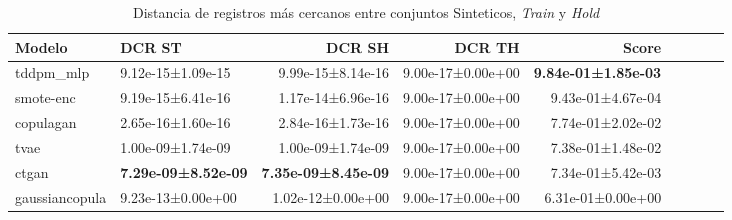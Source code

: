 \begin{table}[H]
\centering
\fontsize{10}{14}\selectfont
\caption{Distancia de registros más cercanos entre conjuntos Sinteticos, \emph{Train} y \emph{Hold}}
\label{table-dcr-economicos-b}
\begin{tabular}{|l|l|r|r|r|r|r|r|r|}
\hline
\rowcolor[gray]{0.8}
Modelo & DCR ST & DCR SH & DCR TH & \textbf{Score} \\
\hline tddpm\_mlp & 9.12e-15±1.09e-15 & 9.99e-15±8.14e-16 & 9.00e-17±0.00e+00 & \bfseries 9.84e-01±1.85e-03 \\
\hline smote-enc & 9.19e-15±6.41e-16 & 1.17e-14±6.96e-16 & 9.00e-17±0.00e+00 & 9.43e-01±4.67e-04 \\
\hline copulagan & 2.65e-16±1.60e-16 & 2.84e-16±1.73e-16 & 9.00e-17±0.00e+00 & 7.74e-01±2.02e-02 \\
\hline tvae & 1.00e-09±1.74e-09 & 1.00e-09±1.74e-09 & 9.00e-17±0.00e+00 & 7.38e-01±1.48e-02 \\
\hline ctgan & \bfseries \cellcolor[rgb]{0.9, 0.54, 0.52} 7.29e-09±8.52e-09 & \bfseries \cellcolor[rgb]{0.9, 0.54, 0.52} 7.35e-09±8.45e-09 & 9.00e-17±0.00e+00 & 7.34e-01±5.42e-03 \\
\hline gaussiancopula & 9.23e-13±0.00e+00 & 1.02e-12±0.00e+00 & 9.00e-17±0.00e+00 & \cellcolor[rgb]{0.9, 0.54, 0.52} 6.31e-01±0.00e+00 \\
\hline
\end{tabular}
\end{table}
